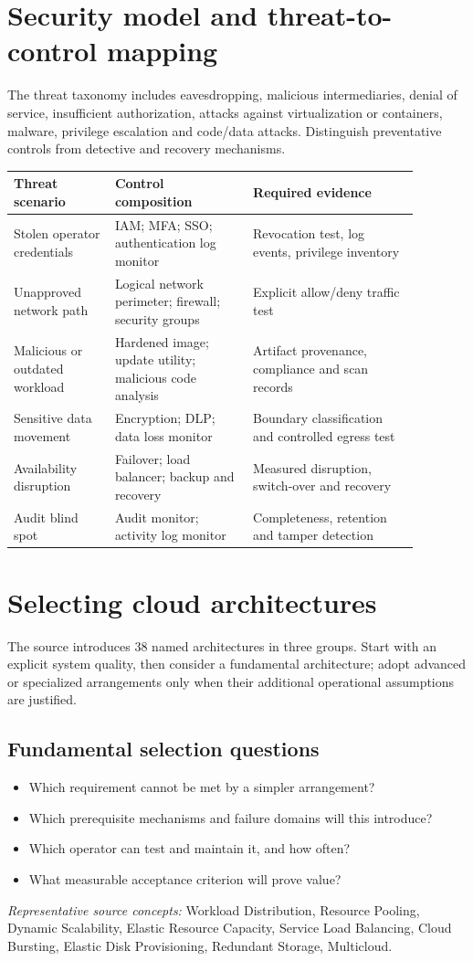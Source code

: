 \documentclass[10pt,letterpaper]{article}
\begin{document}
\section{Security model and threat-to-control mapping}
The threat taxonomy includes eavesdropping, malicious intermediaries, denial of service, insufficient authorization, attacks against virtualization or containers, malware, privilege escalation and code/data attacks. Distinguish preventative controls from detective and recovery mechanisms.\\
\small\begin{longtable}{p{0.22\linewidth}p{0.3\linewidth}p{0.36\linewidth}}
\toprule Threat scenario & Control composition & Required evidence \\\midrule
Stolen operator credentials & IAM; MFA; SSO; authentication log monitor & Revocation test, log events, privilege inventory \\
Unapproved network path & Logical network perimeter; firewall; security groups & Explicit allow/deny traffic test \\
Malicious or outdated workload & Hardened image; update utility; malicious code analysis & Artifact provenance, compliance and scan records \\
Sensitive data movement & Encryption; DLP; data loss monitor & Boundary classification and controlled egress test \\
Availability disruption & Failover; load balancer; backup and recovery & Measured disruption, switch-over and recovery \\
Audit blind spot & Audit monitor; activity log monitor & Completeness, retention and tamper detection \\\bottomrule
\end{longtable}\normalsize
\section{Selecting cloud architectures}
The source introduces 38 named architectures in three groups. Start with an explicit system quality, then consider a fundamental architecture; adopt advanced or specialized arrangements only when their additional operational assumptions are justified.
\subsection{Fundamental selection questions}
\begin{itemize}
\item Which requirement cannot be met by a simpler arrangement?
\item Which prerequisite mechanisms and failure domains will this introduce?
\item Which operator can test and maintain it, and how often?
\item What measurable acceptance criterion will prove value?
\end{itemize}
\emph{Representative source concepts:} Workload Distribution, Resource Pooling, Dynamic Scalability, Elastic Resource Capacity, Service Load Balancing, Cloud Bursting, Elastic Disk Provisioning, Redundant Storage, Multicloud.\\
\end{document}

